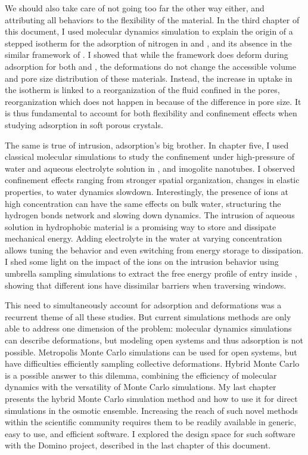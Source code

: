 We should also take care of not going too far the other way either, and
attributing all behaviors to the flexibility of the material. In the third
chapter of this document, I used \abinitio molecular dynamics simulation to
explain the origin of a stepped isotherm for the adsorption of nitrogen in
 and \ZIFCl, and its absence in the similar framework of \ZIFBr. I showed
that while the framework does deform during adsorption for both  and
\ZIFCl, the deformations do not change the accessible volume and pore size
distribution of these materials. Instead, the increase in uptake in the isotherm
is linked to a reorganization of the fluid confined in the pores, reorganization
which does not happen in \ZIFBr because of the difference in pore size. It is
thus fundamental to account for both flexibility and confinement effects when
studying adsorption in soft porous crystals.

The same is true of intrusion, adsorption's big brother. In chapter five, I used
classical molecular simulations to study the confinement under high-pressure of
water and aqueous electrolyte solution in , and imogolite nanotubes. I
observed confinement effects ranging from stronger spatial organization, changes
in elastic properties, to water dynamics slowdown. Interestingly, the presence
of ions at high concentration can have the same effects on bulk water,
structuring the hydrogen bonds network and slowing down dynamics. The intrusion
of aqueous solution in hydrophobic material is a promising way to store and
dissipate mechanical energy. Adding electrolyte in the water at varying
concentration allows tuning the behavior and even switching from energy storage
to dissipation. I shed some light on the impact of the ions on the intrusion
behavior using umbrella sampling simulations to extract the free energy profile
of entry inside , showing that different ions have dissimilar barriers when
traversing  windows.

This need to simultaneously account for adsorption and deformations was a
recurrent theme of all these studies. But current simulations methods are only
able to address one dimension of the problem: molecular dynamics simulations can
describe deformations, but modeling open systems and thus adsorption is not
possible. Metropolis Monte Carlo simulations can be used for open systems, but
have difficulties efficiently sampling collective deformations. Hybrid Monte
Carlo is a possible answer to this dilemma, combining the efficiency of
molecular dynamics with the versatility of Monte Carlo simulations. My last
chapter presents the hybrid Monte Carlo simulation method and how to use it for
direct simulations in the osmotic ensemble. Increasing the reach of such novel
methods within the scientific community requires them to be readily available in
generic, easy to use, and efficient software. I explored the design space for
such software with the Domino project, described in the last chapter of this
document.

